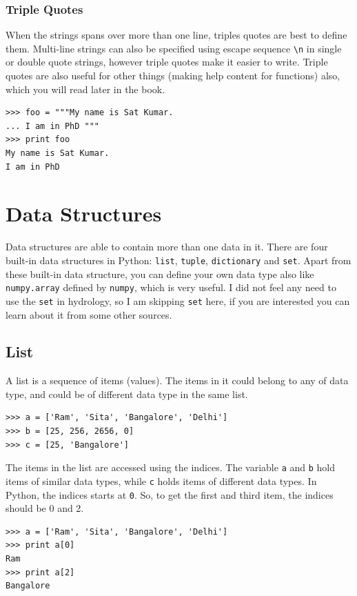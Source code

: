 \documentclass[10pt]{book}
\begin{document}
{\subsubsection{Triple Quotes}
When the strings spans over more than one line, triples quotes are best to define them. 
Multi-line strings can also be specified using escape sequence \verb"\n" in single or 
double quote strings, however triple quotes make it easier to write. 
Triple quotes are also useful for other things (making help content for functions) also, 
which you will read later in the book.
\beforeverb
\begin{verbatim}
>>> foo = """My name is Sat Kumar.
... I am in PhD """
>>> print foo
My name is Sat Kumar.
I am in PhD 
\end{verbatim}
\afterverb


\section{Data Structures}
Data structures are able to contain more than one data in it. 
There are four built-in data structures in Python: 
\verb"list", \verb"tuple", \verb"dictionary" and \verb"set". 
Apart from these built-in data structure, you can define your own data type also 
like \verb"numpy.array" defined by \verb"numpy", which is very useful. 
I did not feel any need to use the \verb"set" in hydrology, so I am skipping \verb"set" here, 
if you are interested you can learn about it from some other sources. 

\subsection{List}
A list is a sequence of items (values). The items in it could belong to any of data type, and could be of different data type in the same list. 
\beforeverb \begin{verbatim}
>>> a = ['Ram', 'Sita', 'Bangalore', 'Delhi']
>>> b = [25, 256, 2656, 0]
>>> c = [25, 'Bangalore'] 
\end{verbatim} \afterverb
The items in the list are accessed using the indices. The variable \verb"a" and \verb"b" hold items of similar data types, while \verb"c" holds items of different data types. In Python, the indices starts at {\tt 0}. So, to get the first and third item, the indices should be 0 and 2.
\beforeverb
\begin{verbatim}
>>> a = ['Ram', 'Sita', 'Bangalore', 'Delhi']
>>> print a[0]
Ram
>>> print a[2]
Bangalore
\end{verbatim}
\afterverb

}
\end{document}
